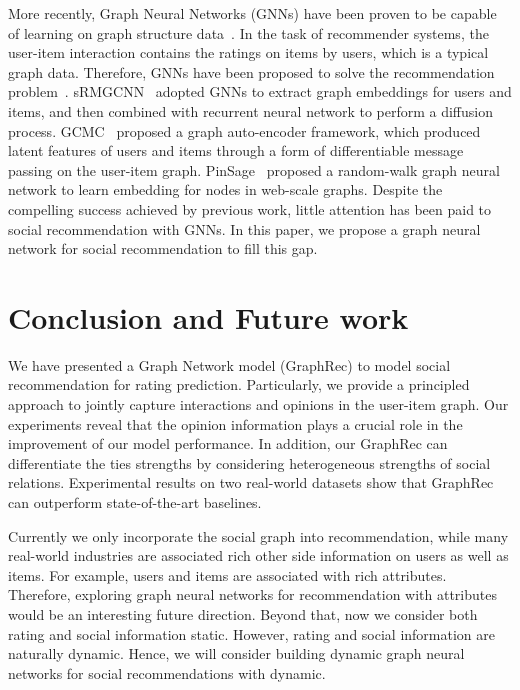 \documentclass[sigconf]{acmart} \copyrightyear{2019}
\begin{document}
More recently, Graph Neural Networks (GNNs) have been proven to be capable of learning on graph structure data~\cite{shuman2013emerging, kipf2017semi, defferrard2016convolutional, derr2018signed, bronstein2017geometric}. In the task of recommender systems, the user-item interaction contains the ratings on items by users, which is a typical graph data. Therefore, GNNs have been proposed to solve the recommendation problem~\cite{monti2017geometric, berg2017graph, Ying:2018:GCN:3219819.3219890}. sRMGCNN~\cite{monti2017geometric} adopted GNNs to extract graph embeddings for users and items, and then combined with recurrent neural network to perform a diffusion process. GCMC~\cite{berg2017graph} proposed a graph auto-encoder framework, which produced latent features of users and items through a form of differentiable message passing on the user-item graph. PinSage~\cite{Ying:2018:GCN:3219819.3219890} proposed a random-walk graph neural network to learn embedding for nodes in web-scale graphs.  Despite the compelling success achieved by previous work, little attention has been paid to social recommendation with GNNs. In this paper, we propose a graph neural network for social recommendation to fill this gap.  




\section{Conclusion and Future work}
\label{sec:conclusion}

We have presented a Graph Network model (GraphRec) to model social recommendation for rating prediction. Particularly, we provide a principled approach to jointly capture interactions and opinions in the user-item graph. Our experiments reveal that the opinion information plays a crucial role in the improvement of our model performance. In addition, our GraphRec can differentiate the ties strengths by considering heterogeneous strengths of social relations.
Experimental results on two real-world datasets show that GraphRec can outperform state-of-the-art baselines.

Currently we only incorporate the social graph into recommendation, while many real-world industries are associated rich other side information on users as well as items. For example, users and items are associated with rich attributes. Therefore, exploring graph neural networks for recommendation with attributes would be an interesting future direction. Beyond that, now we consider both rating and social information static. However, rating and social information are naturally dynamic. Hence, we will consider building dynamic graph neural networks for social recommendations with dynamic.
\end{document}
